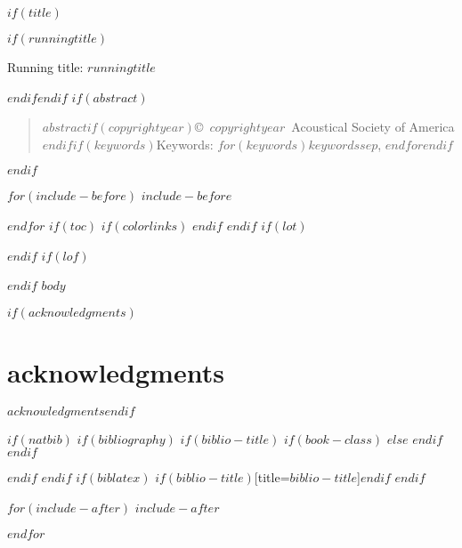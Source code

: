 \documentclass[$if(fontsize)$$fontsize$,$endif$$if(lang)$$babel-lang$,$endif$$if(papersize)$$papersize$paper,$endif$$for(classoption)$$classoption$$sep$,$endfor$]{$documentclass$}
\renewcommand{\refname}{\bfseries\large\uppercase{references}}
\begin{document}
\doublespacing

$if(title)$\maketitle$if(runningtitle)$\begin{center}Running title: $runningtitle$\end{center}$endif$$endif$
\cleardoublepage
$if(abstract)$\begin{abstract}\noindent $abstract$$if(copyrightyear)$\newline\bigskip \copyright~$copyrightyear$~Acoustical Society of America$endif$$if(keywords)$\newline\bigskip\bigskip Keywords: $for(keywords)$$keywords$$sep$, $endfor$$endif$\end{abstract}\cleardoublepage$endif$

$for(include-before)$
$include-before$

$endfor$
$if(toc)$
{
$if(colorlinks)$
\hypersetup{linkcolor=$if(toccolor)$$toccolor$$else$black$endif$}
$endif$
\setcounter{tocdepth}{$toc-depth$}
\tableofcontents
}
$endif$
$if(lot)$
\listoftables
$endif$
$if(lof)$
\listoffigures
$endif$
$body$

\cleardoublepage

$if(acknowledgments)$\section*{acknowledgments}$acknowledgments$\cleardoublepage$endif$


$if(natbib)$
$if(bibliography)$
$if(biblio-title)$
$if(book-class)$
\renewcommand\bibname{$biblio-title$}
$else$
\renewcommand\refname{$biblio-title$}
$endif$
$endif$


$endif$
$endif$
$if(biblatex)$
\printbibliography$if(biblio-title)$[title=$biblio-title$]$endif$
$endif$

\cleardoublepage

$for(include-after)$
$include-after$

$endfor$
\end{document}

